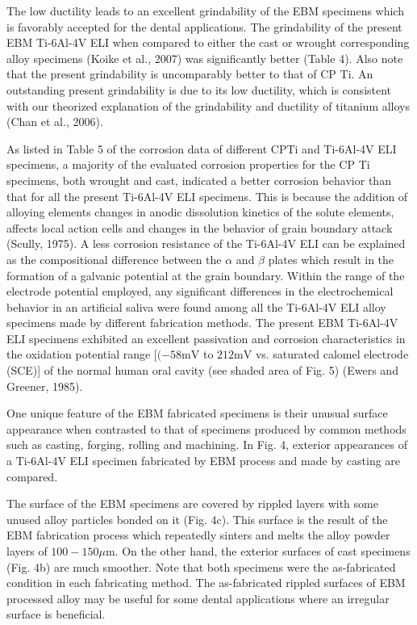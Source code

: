 \documentclass[10pt]{article}
\begin{document}
The low ductility leads to an excellent grindability of the EBM specimens which is favorably accepted for the dental applications. The grindability of the present EBM Ti-6Al-4V ELI when compared to either the cast or wrought corresponding alloy specimens (Koike et al., 2007) was significantly better (Table 4). Also note that the present grindability is uncomparably better to that of CP Ti. An outstanding present grindability is due to its low ductility, which is consistent with our theorized explanation of the grindability and ductility of titanium alloys (Chan et al., 2006).

As listed in Table 5 of the corrosion data of different $\mathrm{CP} \mathrm{Ti}$ and Ti-6Al-4V ELI specimens, a majority of the evaluated corrosion properties for the CP Ti specimens, both wrought and cast, indicated a better corrosion behavior than that for all the present Ti-6Al-4V ELI specimens. This is because the addition of alloying elements changes in anodic dissolution kinetics of the solute elements, affects local action cells and changes in the behavior of grain boundary attack (Scully, 1975). A less corrosion resistance of the Ti-6Al-4V ELI can be explained as the compositional difference between the $\alpha$ and $\beta$ plates which result in the formation of a galvanic potential at the grain boundary. Within the range of the electrode potential employed, any significant differences in the electrochemical behavior in an artificial saliva were found among all the Ti-6Al-4V ELI alloy specimens made by different fabrication methods. The present EBM Ti-6Al-4V ELI specimens exhibited an excellent passivation and corrosion characteristics in the oxidation potential range $[(-58 \mathrm{mV}$ to $212 \mathrm{mV}$ vs. saturated calomel electrode (SCE)] of the normal human oral cavity (see shaded area of Fig. 5) (Ewers and Greener, 1985).

One unique feature of the EBM fabricated specimens is their unusual surface appearance when contrasted to that of specimens produced by common methods such as casting, forging, rolling and machining. In Fig. 4, exterior appearances of a Ti-6Al-4V ELI specimen fabricated by EBM process and made by casting are compared.

The surface of the EBM specimens are covered by rippled layers with some unused alloy particles bonded on it (Fig. 4c). This surface is the result of the EBM fabrication process which repeatedly sinters and melts the alloy powder layers of $100-150 \mu \mathrm{m}$. On the other hand, the exterior surfaces of cast specimens (Fig. 4b) are much smoother. Note that both specimens were the as-fabricated condition in each fabricating method. The as-fabricated rippled surfaces of EBM processed alloy may be useful for some dental applications where an irregular surface is beneficial.
\end{document}
